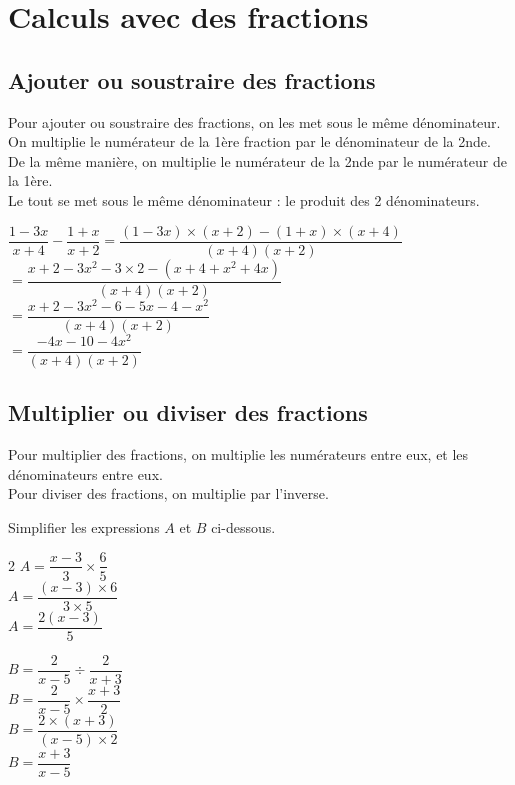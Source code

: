 \documentclass[11pt,a4paper]{book}
\begin{document}

\section{Calculs avec des fractions}
\subsection{Ajouter ou soustraire des fractions}
\begin{bmethode}
	Pour ajouter ou soustraire des fractions, on les met sous le même dénominateur. \\
	On multiplie le numérateur de la 1ère fraction par le dénominateur de la 2nde.\\
	De la même manière, on multiplie le numérateur de la 2nde par le numérateur de la 1ère.\\
	Le tout se met sous le même dénominateur : le produit des 2 dénominateurs.
\end{bmethode}
\begin{bexemple}
	$\dfrac{1-3x}{x+4}-\dfrac{1+x}{x+2}=\dfrac{(1-3x)\times (x+2)-(1+x) \times (x+4)}{(x+4)(x+2)}$\\
	$=\dfrac{x+2-3x^{2}-3\times 2-(x+4+x^{2}+4x)}{(x+4)(x+2)}$\vspace{0.2cm}\\
	$=\dfrac{x+2-3x^{2}-6-5x-4-x^{2}}{(x+4)(x+2)}$\vspace{0.2cm}\\
	$=\dfrac{-4x-10-4x^{2}}{(x+4)(x+2)}$\vspace{0.2cm}\\
\end{bexemple}

\subsection{Multiplier ou diviser des fractions}
\begin{bmethode}
	Pour multiplier des fractions, on multiplie les numérateurs entre eux, et les dénominateurs entre eux.\\
	Pour diviser des fractions, on multiplie par l'inverse.
\end{bmethode}

\begin{bexemple}
	Simplifier les expressions $A$ et $B$ ci-dessous.
	\vspace{-0.3cm}
	\setlength{\columnseprule}{0.4pt} 
	\begin{multicols}{2}  
		$A=\dfrac{x-3}{3}\times \dfrac{6}{5}$ \\
		$A=\dfrac{(x-3)\times 6}{3\times 5}$\\
		$A=\dfrac{2(x-3)}{5}$
		
		
		\columnbreak
		$B=\dfrac{2}{x-5} \div \dfrac{2}{x+3}$ \\
		$B=\dfrac{2}{x-5} \times \dfrac{x+3}{2}$\\
		$B=\dfrac{2\times (x+3)}{(x-5)\times 2}$\\
		$B=\dfrac{x+3}{x-5}$
	\end{multicols} 
\end{bexemple}
\end{document}
